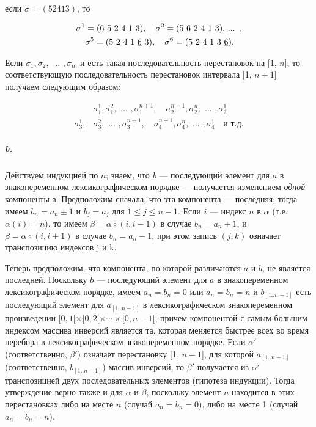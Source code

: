 \documentclass{../../template/mai_book}
\begin{document}
\noindent
если $\sigma = (5 2 4 1 3)$, то

\begin{equation*}
	\begin{split}
	\sigma^1 &= \text{(\underline{6} 5 2 4 1 3)}, \quad \sigma^2 = \text{(5 \underline{6} 2 4 1 3), ... ,}
	\\
	&\sigma^5 = \text{(5 2 4 1 \underline{6} 3)}, \quad \sigma^6 = \text{(5 2 4 1 3 \underline{6})}.
	\end{split}
\end{equation*}

\noindent
Если $\sigma_1, \sigma_2, \text{ ... } , \sigma_{n!}$ и есть такая последовательность перестановок на [1, $n$], то соответствующую последовательность перестановок интервала [1, $n + 1$] получаем следующим образом:

\begin{equation*}
	\begin{split}
	&\sigma_1^1, \sigma_1^2, \text{ ... } , \sigma_1^{n + 1}, \quad \sigma_2^{n + 1}, \sigma_2^n, \text{ ... } , \sigma_2^1
	\\
	\sigma_3^1, &\sigma_3^2, \text{ ... } , \sigma_3^{n + 1}, \quad \sigma_4^{n + 1}, \sigma_4^n, \text{ ... }, \sigma_4^1 \quad \text{и т.д.}
	\end{split}
\end{equation*}

\subparagraph{b.} Действуем индукцией по $n$; знаем, что \textit{b} —  последующий элемент для $a$ в знакопеременном лексикографическом порядке —  получается изменением \textit{одной} компоненты $а$. Предположим сначала, что эта компонента — последняя; тогда имеем $b_n = a_n \pm 1$ и $b_j = a_j$ для $1 \leqslant j \leqslant n - 1$. Если $i$ — индекс $n$ в $\alpha$ (т.е. $\alpha(i) = n$), то имеем $\beta = \alpha \circ (i, i - 1)$ в случае $b_n = a_n + 1$, и $\beta = \alpha \circ (i, i + 1)$ в случае $b_n = a_n - 1$, при этом запись $(j, k)$ означает транспозицию индексов j и k.

Теперь предположим, что компонента, по которой различаются $a$ и $b$, не является последней. Поскольку $b$ — последующий элемент для $a$ в знакопеременном лексикографическом порядке, имеем $a_n = b_n = 0$ или $a_n = b_n = n$ и $b_{[1..n - 1]}$ есть последующий элемент для $a_{[1..n - 1]}$ в лексикографическом знакопеременном произведении $[0, 1[ \times [0, 2[ \times \cdots \times [0, n - 1[$, причем компонентой с самым большим индексом массива инверсий является та, которая меняется быстрее всех во время перебора в лексикографическом знакопеременном порядке. Если $\alpha'$ (соответственно, $\beta'$) означает перестановку [1, $n - 1$], для которой $a_{[1..n - 1]}$ (соответственно, $b_{[1..n - 1]}$) массив инверсий, то $\beta'$ получается из $\alpha'$ транспозицией двух последовательных элементов (гипотеза индукции). Тогда утверждение верно также и для $\alpha$ и $\beta$, поскольку элемент $n$ находится в этих перестановках либо на месте $n$ (случай $a_n = b_n = 0$), либо на месте 1 (случай $a_n = b_n = n$).
\end{document}

